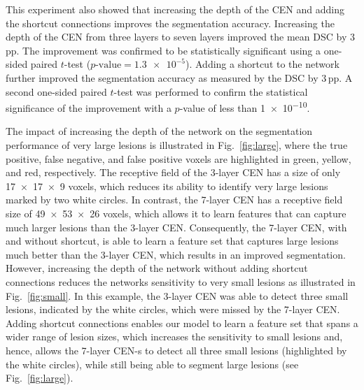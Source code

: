 This experiment also showed that increasing the depth of the CEN
and adding the shortcut connections improves the segmentation accuracy.
Increasing the depth of the CEN from three layers to seven layers improved the
mean DSC by 3\,pp. The improvement was confirmed to be statistically
significant using a one-sided paired $t$-test ($p\text{-value}=\num{1.3e-5}$).
Adding a shortcut to the network further improved the segmentation
accuracy as measured by the DSC by 3\,pp. A second one-sided paired $t$-test
was performed to confirm the statistical significance of the improvement with a
$p$-value of less than \num{1e-10}.

The impact of increasing the depth of the network on the segmentation
performance of very large lesions is illustrated in Fig.~\ref{fig:large}, where
the true positive, false negative, and false positive voxels are highlighted in
green, yellow, and red, respectively. The receptive field of the 3-layer CEN has
a size of only \num{17x17x9} voxels, which reduces its ability to identify very
large lesions marked by two white circles. In contrast, the 7-layer CEN has a
receptive field size of \num{49x53x26} voxels, which allows it to learn features
that can capture much larger lesions than the 3-layer CEN. Consequently, the
7-layer CEN, with and without shortcut, is able to learn a feature set that
captures large lesions much better than the 3-layer CEN, which results in an
improved segmentation. However, increasing the depth of the network without
adding shortcut connections reduces the networks sensitivity to very small
lesions as illustrated in Fig.~\ref{fig:small}. In this example, the 3-layer CEN
was able to detect three small lesions, indicated by the white circles, which
were missed by the 7-layer CEN. Adding shortcut connections enables our model to
learn a feature set that spans a wider range of lesion sizes, which increases
the sensitivity to small lesions and, hence, allows the 7-layer CEN-s to detect
all three small lesions (highlighted by the white circles), while still being
able to segment large lesions (see Fig.~\ref{fig:large}).

